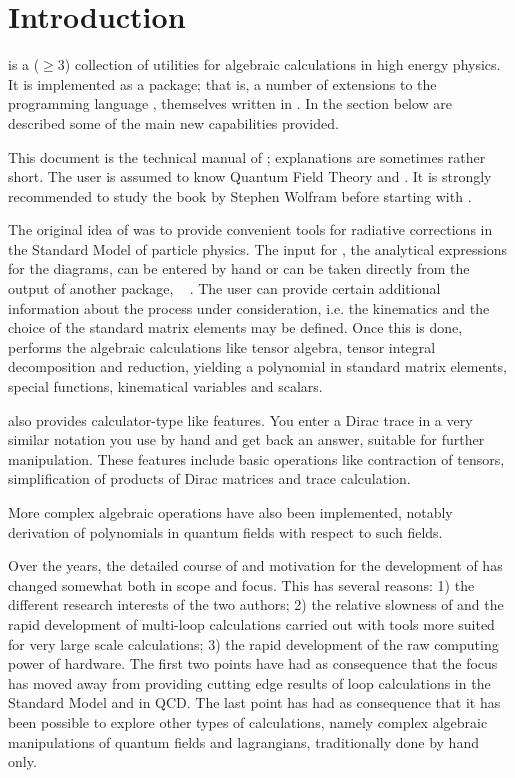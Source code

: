 \section{Introduction}

\fc is a ($\ge 3$) collection of utilities for algebraic calculations in 
high energy physics. It is implemented as a \mma package; that is,
a number of extensions to the programming language \mma,
themselves written in \mma. In the section below are described some of the main new
capabilities provided.

This document is the technical manual of \fc; explanations are sometimes rather short.
The user is assumed to know Quantum Field Theory and \mma.
It is strongly recommended to study the \mma book \cite{Mathematica} by
Stephen Wolfram before starting with \fc.

The original idea of \fc was to provide convenient tools 
for radiative corrections in the Standard Model of particle physics. 
The input for \fc, the analytical expressions for the diagrams, can be 
entered by hand or can be taken directly from the output of another 
package, \fa\ \cite{feynarts} .
The user can provide certain additional  information about the process 
under consideration, i.e. the kinematics and the choice of the standard 
matrix elements may be defined. Once this is done, \fc performs the 
algebraic calculations like tensor algebra, tensor integral decomposition and reduction,
yielding a polynomial in standard matrix elements,  special functions, kinematical 
variables and scalars.

\fc also provides calculator-type like features. You enter a Dirac trace 
in a very similar notation you use by hand and get back an answer, suitable 
for further manipulation. These features include basic operations like contraction of
tensors, simplification of products of Dirac matrices and trace calculation.

More complex algebraic operations have also been implemented, notably derivation
of polynomials in quantum fields with respect to such fields.

Over the years, the detailed course of and motivation for the development of \fc has
changed somewhat both in scope and focus. This has several reasons: 1) the different research
interests of the two authors; 2) the relative slowness of \mma and the rapid development of
multi-loop calculations carried out with tools more suited for very large scale calculations;
3) the rapid development of the raw computing power of hardware. The first two points have had as consequence that the focus has moved away from providing cutting edge results of loop calculations
in the Standard Model and in QCD. The last point has had as consequence that it has been possible
to explore other types of calculations, namely complex algebraic manipulations of quantum fields
and lagrangians, traditionally done by hand only.

